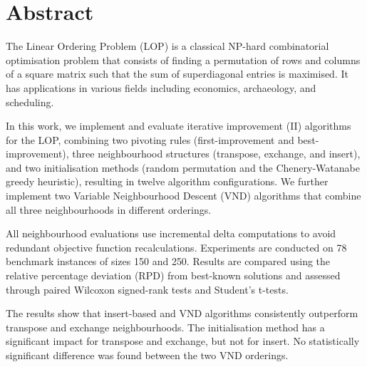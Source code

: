 \chapter*{Abstract}

The Linear Ordering Problem (LOP) is a classical NP-hard combinatorial optimisation
problem that consists of finding a permutation of rows and columns of a square matrix
such that the sum of superdiagonal entries is maximised. It has applications in various
fields including economics, archaeology, and scheduling.

In this work, we implement and evaluate iterative improvement (II) algorithms for the
LOP, combining two pivoting rules (first-improvement and best-improvement), three
neighbourhood structures (transpose, exchange, and insert), and two initialisation
methods (random permutation and the Chenery-Watanabe greedy heuristic), resulting in
twelve algorithm configurations. We further implement two Variable Neighbourhood
Descent (VND) algorithms that combine all three neighbourhoods in different orderings.

All neighbourhood evaluations use incremental delta computations to avoid redundant
objective function recalculations. Experiments are conducted on 78 benchmark instances
of sizes 150 and 250. Results are compared using the relative percentage deviation (RPD)
from best-known solutions and assessed through paired Wilcoxon signed-rank tests and
Student's t-tests.

The results show that insert-based and VND algorithms consistently outperform
transpose and exchange neighbourhoods. The initialisation method has a significant
impact for transpose and exchange, but not for insert. No statistically significant
difference was found between the two VND orderings.
